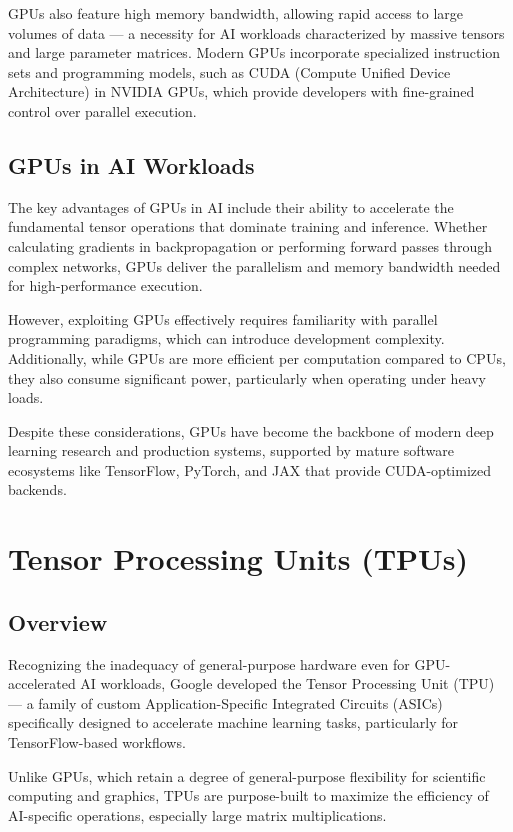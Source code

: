\documentclass[openany]{book}
\begin{document}
GPUs also feature high memory bandwidth, allowing rapid access to large volumes 
of data — a necessity for AI workloads characterized by massive tensors and 
large parameter matrices. Modern GPUs incorporate specialized instruction sets 
and programming models, such as CUDA (Compute Unified Device Architecture) in 
NVIDIA GPUs, which provide developers with fine-grained control over parallel 
execution.

\subsection{GPUs in AI Workloads}
The key advantages of GPUs in AI include their ability to accelerate the 
fundamental tensor operations that dominate training and inference. Whether 
calculating gradients in backpropagation or performing forward passes through 
complex networks, GPUs deliver the parallelism and memory bandwidth needed for 
high-performance execution.

However, exploiting GPUs effectively requires familiarity with parallel 
programming paradigms, which can introduce development complexity. Additionally,
while GPUs are more efficient per computation compared to CPUs, they also 
consume significant power, particularly when operating under heavy loads.

Despite these considerations, GPUs have become the backbone of modern deep 
learning research and production systems, supported by mature software 
ecosystems like TensorFlow, PyTorch, and JAX that provide CUDA-optimized 
backends.

\section{Tensor Processing Units (TPUs)}

\subsection{Overview}
Recognizing the inadequacy of general-purpose hardware even for GPU-accelerated 
AI workloads, Google developed the Tensor Processing Unit (TPU) — a family of 
custom Application-Specific Integrated Circuits (ASICs) specifically designed to 
accelerate machine learning tasks, particularly for TensorFlow-based workflows.

Unlike GPUs, which retain a degree of general-purpose flexibility for scientific 
computing and graphics, TPUs are purpose-built to maximize the efficiency of 
AI-specific operations, especially large matrix multiplications.
\end{document}
